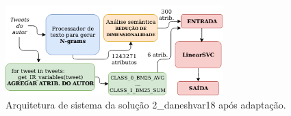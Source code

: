 \begin{figure}[h]
    \centering
    \caption{Arquitetura de sistema da solução 2\_daneshvar18 após adaptação.}
    \begin{center}
        \includegraphics[width=0.75\textwidth]{img/2-daneshvar18-arquitetura-com-ri.png}
    \end{center}
    \vspace{-0.5cm}
    \label{fig:2-daneshvar18-arquitetura-com-ri}
\end{figure}